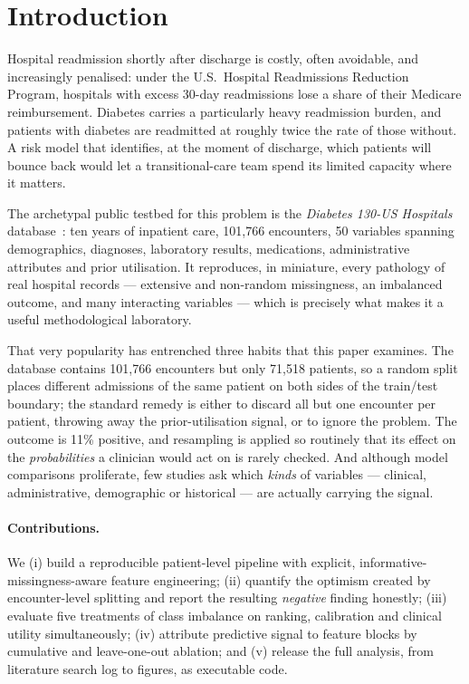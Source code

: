 \documentclass[runningheads]{llncs}
\begin{document}
\section{Introduction}

Hospital readmission shortly after discharge is costly, often avoidable, and
increasingly penalised: under the U.S.\ Hospital Readmissions Reduction Program,
hospitals with excess 30-day readmissions lose a share of their Medicare
reimbursement. Diabetes carries a particularly heavy readmission burden, and patients
with diabetes are readmitted at roughly twice the rate of those without. A risk model
that identifies, at the moment of discharge, which patients will bounce back would let
a transitional-care team spend its limited capacity where it matters.

The archetypal public testbed for this problem is the \emph{Diabetes 130-US Hospitals}
database~\cite{strack2014}: ten years of inpatient care, 101{,}766 encounters,
50 variables spanning demographics, diagnoses, laboratory results, medications,
administrative attributes and prior utilisation. It reproduces, in miniature, every
pathology of real hospital records --- extensive and non-random missingness, an
imbalanced outcome, and many interacting variables --- which is precisely what makes
it a useful methodological laboratory.

That very popularity has entrenched three habits that this paper examines. The
database contains 101{,}766 encounters but only 71{,}518 patients, so a random split
places different admissions of the same patient on both sides of the train/test
boundary; the standard remedy is either to discard all but one encounter per patient,
throwing away the prior-utilisation signal, or to ignore the problem. The outcome is
11\% positive, and resampling is applied so routinely that its effect on the
\emph{probabilities} a clinician would act on is rarely checked. And although model
comparisons proliferate, few studies ask which \emph{kinds} of variables --- clinical,
administrative, demographic or historical --- are actually carrying the signal.

\paragraph{Contributions.} We (i) build a reproducible patient-level pipeline with
explicit, informative-missingness-aware feature engineering; (ii) quantify the
optimism created by encounter-level splitting and report the resulting \emph{negative}
finding honestly; (iii) evaluate five treatments of class imbalance on ranking,
calibration and clinical utility simultaneously; (iv) attribute predictive signal to
feature blocks by cumulative and leave-one-out ablation; and (v) release the full
analysis, from literature search log to figures, as executable code.
\end{document}
